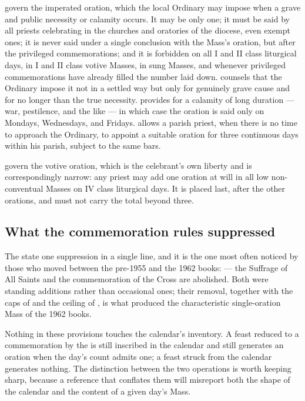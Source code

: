  govern the imperated oration, which the local Ordinary may impose when a grave
and public necessity or calamity occurs. It may be only one; it must be said by all priests
celebrating in the churches and oratories of the diocese, even exempt ones; it is never said
under a single conclusion with the Mass's oration, but after the privileged commemorations; and
it is forbidden on all I and II class liturgical days, in I and II class votive Masses, in sung
Masses, and whenever privileged commemorations have already filled the number laid down.
 counsels that the Ordinary impose it not in a settled way but only for genuinely grave
cause and for no longer than the true necessity.  provides for a calamity of long
duration — war, pestilence, and the like — in which case the oration is said only on Mondays,
Wednesdays, and Fridays.  allows a parish priest, when there is no time to approach the
Ordinary, to appoint a suitable oration for three continuous days within his parish, subject to
the same bars.

 govern the votive oration, which is the celebrant's own liberty and is
correspondingly narrow: any priest may add one oration at will in all low non-conventual Masses
on IV class liturgical days. It is placed last, after the other orations, and must not carry the
total beyond three.

\subsection{What the commemoration rules suppressed}

The  state one suppression in a single line, and
it is the one most often noticed by those who moved between the pre-1955 and the 1962 books:
 — the Suffrage of All
Saints and the commemoration of the Cross are abolished. Both were standing additions rather than
occasional ones; their removal, together with the caps of  and the ceiling of ,
is what produced the characteristic single-oration Mass of the 1962 books.

Nothing in these provisions touches the calendar's inventory. A feast reduced to a commemoration
by the  is still inscribed in the calendar and still generates an oration when
the day's count admits one; a feast struck from the calendar generates nothing. The distinction
between the two operations is worth keeping sharp, because a reference that conflates them will
misreport both the shape of the calendar and the content of a given day's Mass.
